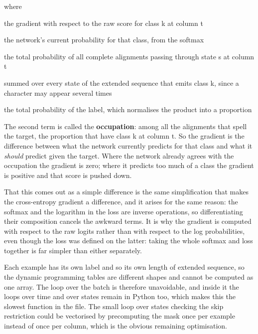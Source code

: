 \noindent where
\begin{description}[leftmargin=2.4em,style=nextline,font=\normalfont\ttfamily]\setlength\itemsep{1pt}
  \item[{$\frac{\partial L}{\partial z_t(k)}$}] \normalfont the gradient with respect to the raw score for class k at column t
  \item[{$p_t(k)$}] \normalfont the network's current probability for that class, from the softmax
  \item[{$\alpha_t(s)\beta_t(s)$}] \normalfont the total probability of all complete alignments passing through state s at column t
  \item[{$\sum_{s : \mathrm{ext}[s]=k}$}] \normalfont summed over every state of the extended sequence that emits class k, since a character may appear several times
  \item[{$P(\mathbf{y}\mid\mathbf{x})$}] \normalfont the total probability of the label, which normalises the product into a proportion
\end{description}
The second term is called the \textbf{occupation}: among all the alignments that spell the target, the proportion that have class k at column t. So the gradient is the difference between what the network currently predicts for that class and what it \emph{should} predict given the target. Where the network already agrees with the occupation the gradient is zero; where it predicts too much of a class the gradient is positive and that score is pushed down.

That this comes out as a simple difference is the same simplification that makes the cross-entropy gradient a difference, and it arises for the same reason: the softmax and the logarithm in the loss are inverse operations, so differentiating their composition cancels the awkward terms. It is why the gradient is computed with respect to the raw logits rather than with respect to the log probabilities, even though the loss was defined on the latter: taking the whole softmax and loss together is far simpler than either separately.


Each example has its own label and so its own length of extended sequence, so the dynamic programming tables are different shapes and cannot be computed as one array. The loop over the batch is therefore unavoidable, and inside it the loops over time and over states remain in Python too, which makes this the slowest function in the file. The small loop over states checking the skip restriction could be vectorised by precomputing the mask once per example instead of once per column, which is the obvious remaining optimisation.



